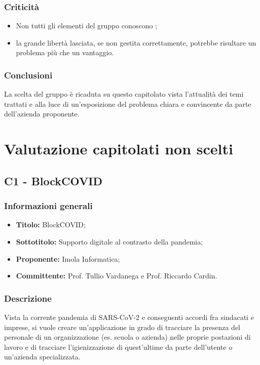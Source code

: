 \documentclass[]{article}
\begin{document}
			\subsubsection{Criticità}
			\begin{itemize}
				\item Non tutti gli elementi del gruppo conoscono ;
				\item la grande libertà lasciata, se non gestita correttamente, potrebbe risultare un problema più che un vantaggio.
			\end{itemize}

			\subsubsection{Conclusioni}
				La scelta del gruppo è ricaduta su questo capitolato vista l'attualità dei temi trattati e alla luce di un'esposizione del problema chiara e convincente da parte dell'azienda proponente.
	\newpage

	\section{Valutazione capitolati non scelti}
		\subsection{C1 - BlockCOVID}
			\subsubsection{Informazioni generali}
			\begin{itemize}
				\item \textbf{Titolo:} BlockCOVID;
				\item \textbf{Sottotitolo:} Supporto digitale al contrasto della pandemia;
				\item \textbf{Proponente:} Imola Informatica;
				\item \textbf{Committente:} Prof. Tullio Vardanega e Prof. Riccardo Cardin.
			\end{itemize}

			\subsubsection{Descrizione}
			Vista la corrente pandemia di SARS-CoV-2 e conseguenti accordi fra sindacati e imprese, si vuole creare un'applicazione in grado di tracciare la presenza del personale di un organizzazione (es. scuola o azienda) nelle proprie postazioni di lavoro e di tracciare l'igienizzazione di quest'ultime da parte dell'utente o un'azienda specializzata.
\end{document}
